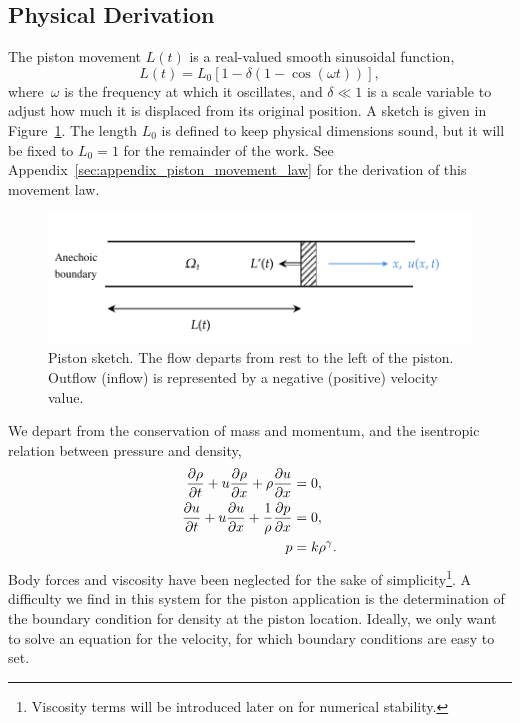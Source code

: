 \documentclass[../../thesis.tex]{subfiles}
\begin{document}
\subsection{Physical Derivation}
The piston movement $L(t)$ is a real-valued smooth sinusoidal function,
\begin{equation}
    L(t) = L_0 \left[1 - \delta \left(1 - \cos \left(\omega t\right)\right)\right],
\end{equation}
where~$\omega$ is the frequency at which it oscillates, 
and \mbox{$\delta \ll 1$} is a scale variable to adjust how much it is displaced from its original position. 
A sketch is given in Figure~\ref{fig:piston}.
The length $L_0$ is defined to keep physical dimensions sound, 
but it will be fixed to $L_0=1$ for the remainder of the work.
See Appendix~\ref{sec:appendix_piston_movement_law} 
for the derivation of this movement law.
\begin{figure}[h]
    \includegraphics[width=1.05\columnwidth]{research_project/piston/figures/piston.pdf}
    \caption{Piston sketch. The flow departs from rest to the left of the piston.
    Outflow (inflow) is represented by a negative (positive) velocity value.}
    \label{fig:piston}
\end{figure}

We depart from the conservation of mass and momentum, 
and the isentropic relation between pressure and density,
\begin{subequations}
\begin{align}
    \pdv{\rho}{t} + u \pdv{\rho}{x} + \rho \pdv{u}{x} &= 0, \\ 
    \pdv{u}{t} + u \pdv{u}{x} + \frac{1}{\rho}\pdv{p}{x} &= 0, \\
    p &= k \rho^{\gamma} \label{eq:isentropic_relation}. 
\end{align}
\end{subequations}
Body forces and viscosity have been neglected for the sake of simplicity\footnote{Viscosity terms will be introduced later on for numerical stability.}.
A difficulty we find in this system for the piston application is the determination of the boundary condition for density at the piston location.
Ideally, we only want to solve an equation for the velocity, for which boundary conditions are easy to set.
\end{document}
